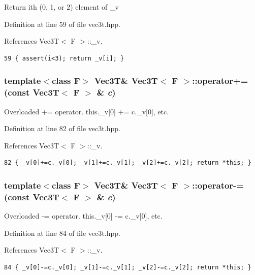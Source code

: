 Return ith (0, 1, or 2) element of \_\-v 

Definition at line 59 of file vec3t.hpp.

References Vec3T$<$ F $>$::\_\-v.

\footnotesize\begin{verbatim}59 { assert(i<3); return _v[i]; }
\end{verbatim}\normalsize 


\subsubsection{\setlength{\rightskip}{0pt plus 5cm}template$<$class F$>$ {\bf Vec3T}\& {\bf Vec3T}$<$ F $>$::operator+= (const {\bf Vec3T}$<$ F $>$ \& {\em c})\hspace{0.3cm}{\tt  [inline]}}\label{classVec3T_45ae363ae4fb850529eec394914c14f5_45ae363ae4fb850529eec394914c14f5}


Overloaded += operator. this.\_\-v[0] += c.\_\-v[0], etc. 

Definition at line 82 of file vec3t.hpp.

References Vec3T$<$ F $>$::\_\-v.

\footnotesize\begin{verbatim}82 { _v[0]+=c._v[0]; _v[1]+=c._v[1]; _v[2]+=c._v[2]; return *this; }
\end{verbatim}\normalsize 


\subsubsection{\setlength{\rightskip}{0pt plus 5cm}template$<$class F$>$ {\bf Vec3T}\& {\bf Vec3T}$<$ F $>$::operator-= (const {\bf Vec3T}$<$ F $>$ \& {\em c})\hspace{0.3cm}{\tt  [inline]}}\label{classVec3T_30e20de83a90c1c7bf1c1fd824d00c90_30e20de83a90c1c7bf1c1fd824d00c90}


Overloaded -= operator. this.\_\-v[0] -= c.\_\-v[0], etc. 

Definition at line 84 of file vec3t.hpp.

References Vec3T$<$ F $>$::\_\-v.

\footnotesize\begin{verbatim}84 { _v[0]-=c._v[0]; _v[1]-=c._v[1]; _v[2]-=c._v[2]; return *this; }
\end{verbatim}\normalsize 


